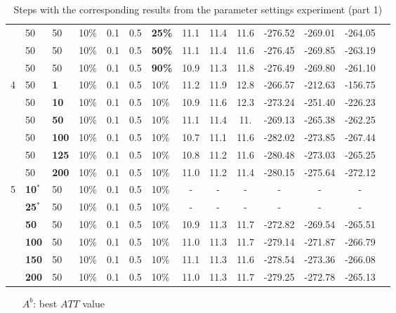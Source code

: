 \begin{table}
\begin{tabular}{|l|l|l|l|l|l|l||c|c|c|c|c|c|c|}
    ~ & 50 & 50 & 10\% & 0.1 & 0.5 & \textbf{25\%} & 11.1 & 11.4 & 11.6 & -276.52 & -269.01 & -264.05 \\
    ~ & 50 & 50 & 10\% & 0.1 & 0.5 & \textbf{50\%} & 11.1 & 11.4 & 11.6 & -276.45 & -269.85 & -263.19 \\
    ~ & 50 & 50 & 10\% & 0.1 & 0.5 & \textbf{90\%} &10.9 & 11.3 & 11.8 & -276.49 & -269.80 & -261.10 \\
    \hline
    4 & 50 & \textbf{1} & 10\% & 0.1 & 0.5 & 10\% &11.2 & 11.9 & 12.8 & -266.57 & -212.63 & -156.75 \\
    ~ & 50 & \textbf{10} & 10\% & 0.1 & 0.5 & 10\% & 10.9 & 11.6 & 12.3 & -273.24 & -251.40 & -226.23 \\
    ~ & 50 & \textbf{50} & 10\% & 0.1 & 0.5 & 10\% &  11.1 & 11.4 & 11. & -269.13 & -265.38 & -262.25 \\
    ~ & 50 & \textbf{100} & 10\% & 0.1 & 0.5 & 10\% & 10.7 & 11.1 & 11.6 & -282.02 & -273.85 & -267.44 \\
    ~ & 50 & \textbf{125} & 10\% & 0.1 & 0.5 & 10\% & 10.8 & 11.2 & 11.6 & -280.48 & -273.03 & -265.25 \\
    ~ & 50 & \textbf{200} & 10\% & 0.1 & 0.5 & 10\% & 11.0 & 11.2 & 11.4 & -280.15 & -275.64 & -272.12  \\
    \hline
    5 & \textbf{10$^*$} & 50 & 10\% & 0.1 & 0.5 & 10\% & - & - & - & - & - & - \\
    ~ & \textbf{25$^*$} & 50 & 10\% & 0.1 & 0.5 & 10\% & - & - & - & - & - & - \\
    ~ & \textbf{50} & 50 & 10\% & 0.1 & 0.5 & 10\% &10.9 & 11.3 & 11.7 & -272.82 & -269.54 & -265.51 \\
    ~ & \textbf{100} & 50 & 10\% & 0.1 & 0.5 & 10\% & 11.0 & 11.3 & 11.7 & -279.14 & -271.87 & -266.79 \\
    ~ & \textbf{150} & 50 & 10\% & 0.1 & 0.5 & 10\% & 11.1 & 11.3 & 11.6 & -278.54 & -273.36 & -266.08 \\
    ~ & \textbf{200} & 50 & 10\% & 0.1 & 0.5 & 10\% & 11.0 & 11.3 & 11.7 & -279.25 & -272.78 & -265.13 \\
    \hline
    \end{tabular}
    \caption {Steps with the corresponding results from the parameter settings experiment (part 1)}
    \tiny
    \begin{itemize}[noitemsep]
    \item[$A^b$:] best $ATT$ value

\end{itemize}
\end{table}
